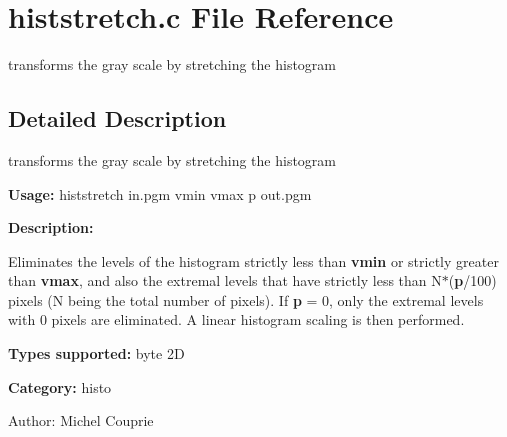 \section{histstretch.c File Reference}
\label{histstretch_8c}
transforms the gray scale by stretching the histogram 



\subsection{Detailed Description}
transforms the gray scale by stretching the histogram 

{\bf Usage:} histstretch in.pgm vmin vmax p out.pgm

{\bf Description:}

Eliminates the levels of the histogram strictly less than {\bf vmin} or strictly greater than {\bf vmax}, and also the extremal levels that have strictly less than N$\ast$({\bf p}/100) pixels (N being the total number of pixels). If {\bf p} = 0, only the extremal levels with 0 pixels are eliminated. A linear histogram scaling is then performed.

{\bf Types supported:} byte 2D

{\bf Category:} histo

\begin{Desc}
\item[Author:]Michel Couprie \end{Desc}

